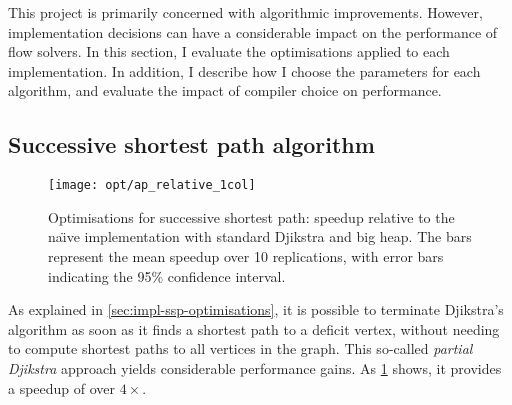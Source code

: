 This project is primarily concerned with algorithmic improvements. However, implementation decisions can have a considerable impact on the performance of flow solvers. In this section, I evaluate the optimisations applied to each implementation. In addition, I describe how I choose the parameters for each algorithm, and evaluate the impact of compiler choice on performance.

%
%
%
%
%
%
%
\subsection{Successive shortest path algorithm}

\begin{figure}
    \centering
    \texttt{[image: opt/ap\_relative\_1col]}
    \caption[Optimisations for successive shortest path]{Optimisations for successive shortest path: speedup relative to the na\"{\i}ve implementation with standard Djikstra and big heap. The bars represent the mean speedup over 10 replications, with error bars indicating the 95\% confidence interval.}
    \label{fig:opt-ap}
\end{figure}

As explained in \cref{sec:impl-ssp-optimisations}, it is possible to terminate Djikstra's algorithm as soon as it finds a shortest path to a deficit vertex, without needing to compute shortest paths to all vertices in the graph. This so-called \emph{partial Djikstra} approach yields considerable performance gains. As \cref{fig:opt-ap} shows, it provides a speedup of over $4\times$.

